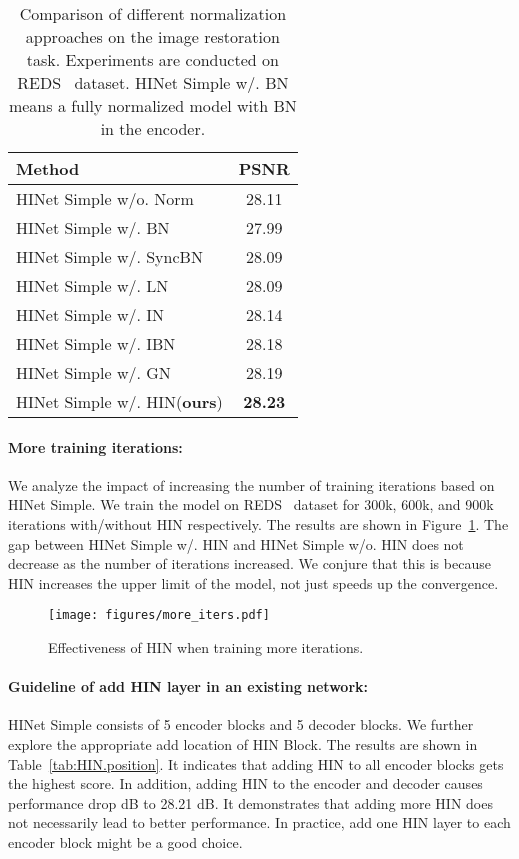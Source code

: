 \documentclass[final]{cvpr}
\newcommand{\tablestyle}[2]{\setlength{\tabcolsep}{#1}\renewcommand{\arraystretch}{#2}\centering\footnotesize}
\begin{document}
\begin{table}[h]
    \centering
    \tablestyle{5pt}{1.05}\setlength{\tabcolsep}{1.mm}\begin{tabular}{l|c}
        Method &PSNR \\
        \hline
        HINet Simple w/o. Norm & 28.11 \\
        HINet Simple w/. BN~\cite{ioffe2015batch} & 27.99\\
        HINet Simple w/. SyncBN~\cite{zhang2018context} &28.09\\
        HINet Simple w/. LN~\cite{ba2016layer} & 28.09 \\
        HINet Simple w/. IN~\cite{ulyanov2017improved} & 28.14 \\
        HINet Simple w/. IBN~\cite{pan2018two} & 28.18 \\
        HINet Simple w/. GN~\cite{wu2018group} & 28.19\\
        \hline
        HINet Simple w/. HIN(\textbf{ours}) & \textbf{28.23}\\
    \end{tabular}
\caption{Comparison of different normalization approaches on the image restoration task. Experiments are conducted on REDS~\cite{nah2019ntire} dataset. HINet Simple w/. BN means a fully normalized model with BN in the encoder.}
\label{tab:vs.norm}
\end{table}

\paragraph{More training iterations:}
We analyze the impact of increasing the number of training iterations based on HINet Simple. We train the model on REDS~\cite{nah2019ntire} dataset for 300k, 600k, and 900k iterations with/without HIN respectively. The results are shown in Figure~\ref{fig:more_iters}. The gap between HINet Simple w/. HIN and HINet Simple w/o. HIN does not decrease as the number of iterations increased. We conjure that this is because HIN increases the upper limit of the model, not just speeds up the convergence.

\begin{figure}
    \centering
    \texttt{[image: figures/more\_iters.pdf]}
    \caption{Effectiveness of HIN when training more iterations.}
    \label{fig:more_iters}
\end{figure}

\paragraph{Guideline of add HIN layer in an existing network:}
HINet Simple consists of 5 encoder blocks and 5 decoder blocks. We further explore the appropriate add location of HIN Block. The results are shown in Table~\ref{tab:HIN.position}. It indicates that adding HIN to all encoder blocks gets the highest score. In addition, adding HIN to the encoder and decoder causes performance drop  dB to 28.21 dB. It demonstrates that adding more HIN does not necessarily lead to better performance. In practice, add one HIN layer to each encoder block might be a good choice. 
\end{document}
